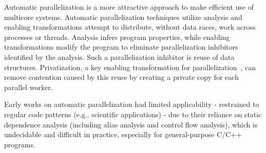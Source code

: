 %
%
Automatic parallelization is a more attractive approach to make
efficient use of multicore systems.
%
Automatic parallelization techniques utilize analysis and enabling
transformations attempt to distribute, without data races, work across
processes or threads.
%
Analysis infers program properties, while enabling transformations
modify the program to eliminate parallelization inhibitors identified
by the analysis.
%
Such a parallelization inhibitor is reuse of data structures.
Privatization, a key enabling transformation for
parallelization~\cite{citations_from_privateer}, can remove contention
caused by this reuse by creating a private copy for each parallel
worker.


%

%
Early works on automatic parallelization had limited applicability -
restrained to regular code patterns (e.g., scientific applications) -
due to their reliance on static dependence analysis (including alias
analysis and control flow analysis), which is undecidable and
difficult in practice, especially for general-purpose C/C++ programs.
%

%
%
%

